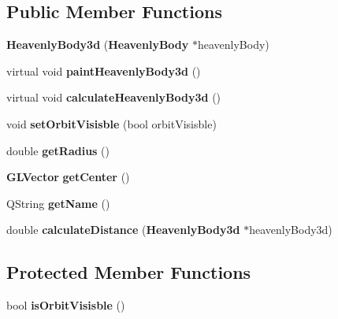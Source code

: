 \subsection*{\-Public \-Member \-Functions}
\begin{DoxyCompactItemize}
\item 
{\bfseries \-Heavenly\-Body3d} ({\bf \-Heavenly\-Body} $\ast$heavenly\-Body)\label{db/d73/classHeavenlyBody3d_aa720873967d60dd36a7531545f25f5ce}

\item 
virtual void {\bfseries paint\-Heavenly\-Body3d} ()\label{db/d73/classHeavenlyBody3d_a030592ed6fd43987d2b004f56a3ab3a8}

\item 
virtual void {\bfseries calculate\-Heavenly\-Body3d} ()\label{db/d73/classHeavenlyBody3d_ac1c46a03505f9b7bb57191f22d50ba27}

\item 
void {\bfseries set\-Orbit\-Visisble} (bool orbit\-Visisble)\label{db/d73/classHeavenlyBody3d_abc21e2ca9a6222ef3edfac68738ecb7d}

\item 
double {\bfseries get\-Radius} ()\label{db/d73/classHeavenlyBody3d_a6a626af4873c1783a7134a75aa27936b}

\item 
{\bf \-G\-L\-Vector} {\bfseries get\-Center} ()\label{db/d73/classHeavenlyBody3d_abc8856ee19131167a631f66cb0e40105}

\item 
\-Q\-String {\bfseries get\-Name} ()\label{db/d73/classHeavenlyBody3d_afde15f252ebff5b5a791f42ad6aca61d}

\item 
double {\bfseries calculate\-Distance} ({\bf \-Heavenly\-Body3d} $\ast$heavenly\-Body3d)\label{db/d73/classHeavenlyBody3d_aa5abdb6a4b58366c48f86b41b3c24574}

\end{DoxyCompactItemize}
\subsection*{\-Protected \-Member \-Functions}
\begin{DoxyCompactItemize}
\item 
bool {\bfseries is\-Orbit\-Visisble} ()\label{db/d73/classHeavenlyBody3d_a13a4439fcde475a19632b84e3e244446}

\end{DoxyCompactItemize}
